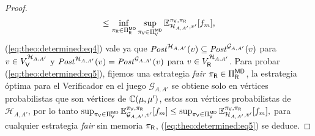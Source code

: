 \begin{proof}
\begin{equation}
    \leq 
     \inf_{\pi_{\mathsf{R}} \in \Pi_{\mathsf{R}}^{\mathsf{M}\mathsf{D}}} \sup_{\pi_{\mathsf{V}} \in \Pi_{\mathsf{V}}^{\mathsf{M}\mathsf{D}}} \mathbb{E}_{\mathcal{H}_{A,A'},v'}^{\pi_{\mathsf{V}},\pi_{\mathsf{R}}}[f_{m}],
\end{equation}
(\ref{eq:theo:determined:eq4}) vale ya que $\mathit{Post}^{\mathcal{H}_{A,A'}}(v) \subseteq \mathit{Post}^{\mathcal{G}_{A,A'}}(v)$ para $v \in V^{\mathcal{H}_{A,A'}}_{\mathsf{V}}$ y
$\mathit{Post}^{\mathcal{H}_{A,A'}}(v) = \mathit{Post}^{\mathcal{G}_{A,A'}}(v)$ para $v \in V^{\mathcal{H}_{A,A'}}_{\mathsf{R}}$.  Para probar (\ref{eq:theo:determined:eq5}), fijemos una estrategia \emph{fair} $\pi_{\mathsf{R}} \in \Pi_{\mathsf{R}}^{\mathsf{M} \mathsf{D}}$, la estrategia óptima para el Verificador en el juego $\mathcal{G}_{A,A'}$ se obtiene solo en vértices probabilistas que son vértices de $\mathbb{C}(\mu,\mu')$, estos son vértices probabilistas de $\mathcal{H}_{A,A'}$, por lo tanto 
$  \sup_{\pi_{\mathsf{V}} \in \Pi_{\mathsf{V}}^{\mathsf{M}\mathsf{D}}} \mathbb{E}_{\mathcal{G}_{A,A'},v'}^{\pi_{\mathsf{V}},\pi_{\mathsf{R}}}[f_{m}]
    \leq 
     \sup_{\pi_{\mathsf{V}} \in \Pi_{\mathsf{V}}^{\mathsf{M}\mathsf{D}}} \mathbb{E}_{\mathcal{H}_{A,A'},v'}^{\pi_{\mathsf{V}},\pi_{\mathsf{R}}}[f_{m}],$
para cualquier estrategia \emph{fair} sin memoria $\pi_{\mathsf{R}}$,  (\ref{eq:theo:determined:eq5}) se deduce.


\end{proof}
